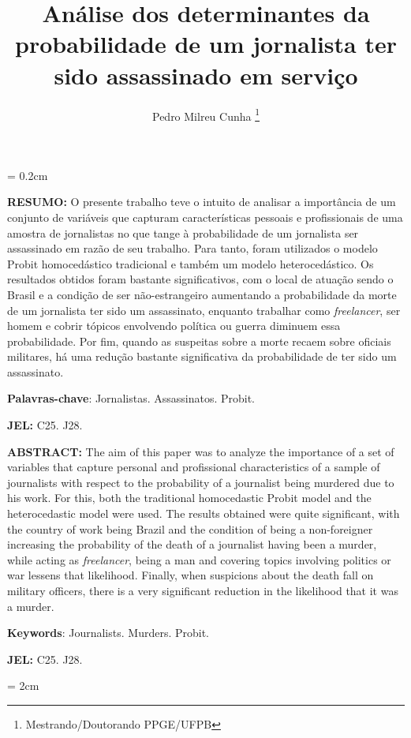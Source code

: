 \documentclass[12pt,
               openright,
               oneside,
               a4paper,
							 section=TITLE,     %
               subsection=Title,  %
               english,brazil]{article}
\title{Análise dos determinantes da probabilidade de um jornalista ter sido assassinado em serviço}
\author{Pedro Milreu Cunha \thanks{Mestrando/Doutorando PPGE/UFPB}}
\date{}
\begin{document}
\topmargin = 0.2cm
\maketitle

\setlength{\parindent}{0cm}



\textbf{RESUMO:} O presente trabalho teve o intuito de analisar a importância de um conjunto de variáveis que capturam características pessoais e profissionais de uma amostra de jornalistas no que tange à probabilidade de um jornalista ser assassinado em razão de seu trabalho. Para tanto, foram utilizados o modelo Probit homocedástico tradicional e também um modelo heterocedástico. Os resultados obtidos foram bastante significativos, com o local de atuação sendo o Brasil e a condição de ser não-estrangeiro aumentando a probabilidade da morte de um jornalista ter sido um assassinato, enquanto trabalhar como \textit{freelancer}, ser homem e cobrir tópicos envolvendo política ou guerra diminuem essa probabilidade. Por fim, quando as suspeitas sobre a morte recaem sobre oficiais militares, há uma redução bastante significativa da probabilidade de ter sido um assassinato.

\textbf{Palavras-chave}: Jornalistas. Assassinatos. Probit.

\textbf{JEL:} C25. J28.

\vspace{0.6cm}

\textbf{ABSTRACT:} The aim of this paper was to analyze the importance of a set of variables that capture personal and profissional characteristics of a sample of journalists with respect to the probability of a journalist being murdered due to his work. For this, both the traditional homocedastic Probit model and the heterocedastic model were used. The results obtained were quite significant, with the country of work being Brazil and the condition of being a non-foreigner increasing the probability of the death of a journalist having been a murder, while acting as \textit {freelancer}, being a man and covering topics involving politics or war lessens that likelihood. Finally, when suspicions about the death fall on military officers, there is a very significant reduction in the likelihood that it was a murder.

\textbf{Keywords}: Journalists. Murders. Probit.

\textbf{JEL:} C25. J28.

\newpage
\topmargin = 2cm
\setlength{\parindent}{1.5cm}
\end{document}
